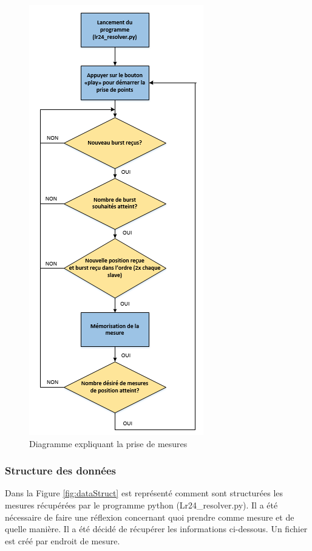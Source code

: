 \begin{figure}[htp]
	\begin{center}
		\includegraphics[scale=0.7]{figures/PriseMesures.png}
		\caption{Diagramme expliquant la prise de mesures}
		\label{fig:mesures} %
	\end{center}
\end{figure}

\subsubsection{Structure des données}

Dans la Figure \ref{fig:dataStruct} est représenté comment sont structurées les mesures récupérées par le programme python (Lr24\_resolver.py). Il a été nécessaire de faire une réflexion concernant quoi prendre comme mesure et de quelle manière. Il a été décidé de récupérer les informations ci-dessous. Un fichier est créé par endroit de mesure.


